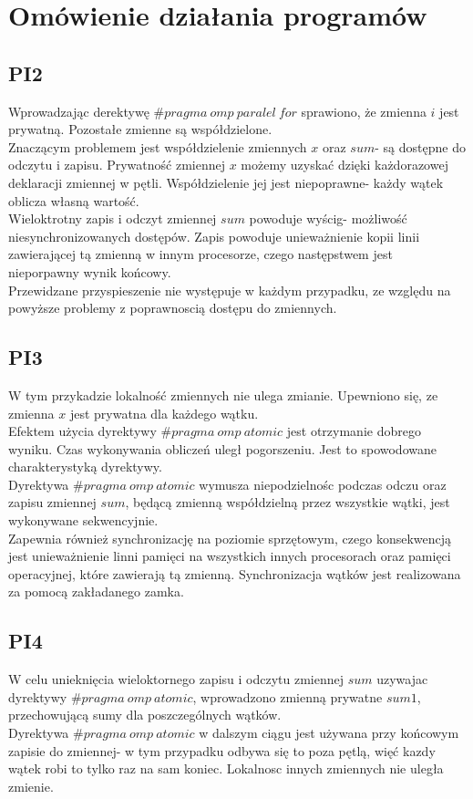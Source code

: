 \documentclass{article}
\begin{document}
\newpage

\section{Omówienie działania programów}
\subsection{PI2}
Wprowadzając derektywę $\#pragma\:omp\:paralel\:for$ sprawiono, że zmienna $i$ jest prywatną. Pozostałe zmienne są współdzielone.\\
Znaczącym problemem jest współdzielenie zmiennych $x$ oraz $sum$- są dostępne do odczytu i zapisu. Prywatność zmiennej $x$ możemy uzyskać dzięki każdorazowej deklaracji zmiennej w pętli. Współdzielenie jej jest niepoprawne- każdy wątek oblicza własną wartość. \\
Wieloktrotny zapis i odczyt zmiennej $sum$ powoduje wyścig- możliwość niesynchronizowanych dostępów. Zapis powoduje unieważnienie kopii linii zawierającej tą zmienną w innym procesorze, czego następstwem jest nieporpawny wynik końcowy.\\
Przewidzane przyspieszenie nie występuje w każdym przypadku, ze względu na powyższe problemy z poprawnoscią dostępu do zmiennych. 
\subsection{PI3}
W tym przykadzie lokalność zmiennych nie ulega zmianie. Upewniono się, ze zmienna $x$ jest prywatna dla każdego wątku.\\
Efektem użycia dyrektywy $\#pragma\:omp\:atomic$ jest otrzymanie dobrego wyniku. Czas wykonywania obliczeń uległ pogorszeniu. Jest to spowodowane charakterystyką dyrektywy.\\
Dyrektywa $\#pragma\:omp\:atomic$ wymusza niepodzielnośc podczas odczu oraz zapisu zmiennej $sum$, będącą zmienną współdzielną przez wszystkie wątki, jest wykonywane sekwencyjnie. \\
Zapewnia również synchronizację na poziomie sprzętowym, czego konsekwencją jest unieważnienie linni pamięci na wszystkich innych procesorach oraz pamięci operacyjnej, które zawierają tą zmienną. Synchronizacja wątków jest realizowana za pomocą zakładanego zamka.
\subsection{PI4}
W celu unieknięcia wieloktornego zapisu i odczytu zmiennej $sum$ uzywajac dyrektywy $\#pragma\:omp\:atomic$, wprowadzono zmienną prywatne $sum1$, przechowującą sumy dla poszczególnych wątków. \\
Dyrektywa $\#pragma\:omp\:atomic$ w dalszym ciągu jest używana przy końcowym zapisie do zmiennej- w tym przypadku odbywa się to poza pętlą, więć kazdy wątek robi to tylko raz na sam koniec.
Lokalnosc innych zmiennych nie uległa zmienie.
\end{document}
